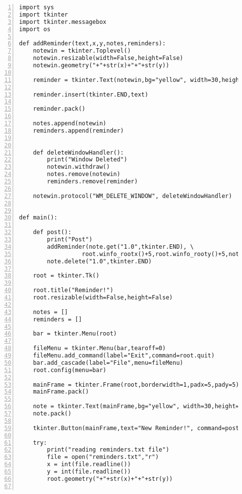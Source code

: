 \label{postitcode}
\begin{lstlisting}[basicstyle=\ttfamily\scriptsize,numbers=left]
import sys
import tkinter
import tkinter.messagebox
import os

def addReminder(text,x,y,notes,reminders):
    notewin = tkinter.Toplevel()
    notewin.resizable(width=False,height=False)
    notewin.geometry("+"+str(x)+"+"+str(y))
    
    reminder = tkinter.Text(notewin,bg="yellow", width=30,height=15)

    reminder.insert(tkinter.END,text)
    
    reminder.pack()
    
    notes.append(notewin)
    reminders.append(reminder)
    
    
    def deleteWindowHandler():
        print("Window Deleted")
        notewin.withdraw()
        notes.remove(notewin)
        reminders.remove(reminder)
    
    notewin.protocol("WM_DELETE_WINDOW", deleteWindowHandler)
    

def main():
    
    def post():
        print("Post")
        addReminder(note.get("1.0",tkinter.END), \
                  root.winfo_rootx()+5,root.winfo_rooty()+5,notes,reminders)
        note.delete("1.0",tkinter.END)               
   
    root = tkinter.Tk()
    
    root.title("Reminder!")
    root.resizable(width=False,height=False)

    notes = []
    reminders = []

    bar = tkinter.Menu(root)
    
    fileMenu = tkinter.Menu(bar,tearoff=0)
    fileMenu.add_command(label="Exit",command=root.quit)
    bar.add_cascade(label="File",menu=fileMenu)
    root.config(menu=bar)
    
    mainFrame = tkinter.Frame(root,borderwidth=1,padx=5,pady=5)
    mainFrame.pack()
    
    note = tkinter.Text(mainFrame,bg="yellow", width=30,height=15)
    note.pack()
    
    tkinter.Button(mainFrame,text="New Reminder!", command=post).pack()
  
    try:
        print("reading reminders.txt file")
        file = open("reminders.txt","r")
        x = int(file.readline())
        y = int(file.readline())
        root.geometry("+"+str(x)+"+"+str(y))
        

\end{lstlisting}

